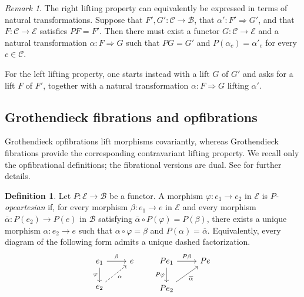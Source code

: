 \documentclass[12pt]{amsart}
\theoremstyle{definition}
\newtheorem{definition}[teo]{Definition}
\theoremstyle{remark}
\newtheorem{remark}{Remark}
\numberwithin{figure}{section}%
\newcommand{\Ba}{\mathcal{B}}
\newcommand{\bbar}{\overline}
\newcommand{\CC}{\mathcal{C}}
\newcommand{\E}{\mathcal{E}}
\begin{document}
\begin{remark}\label{Rem:Lift_Natural}
The right lifting property can equivalently be expressed in terms of
natural transformations. Suppose that
\(F',G'\colon\CC\to\Ba\), that
\(\alpha'\colon F'\Rightarrow G'\), and that
\(F\colon\CC\to\E\) satisfies \(PF=F'\). Then there must exist a functor
\(G\colon\CC\to\E\) and a natural transformation
\(\alpha\colon F\Rightarrow G\) such that
\(PG=G'\) and \(P(\alpha_c)=\alpha'_c\) for every \(c\in\CC\).

For the left lifting property, one starts instead with a lift \(G\) of
\(G'\) and asks for a lift \(F\) of \(F'\), together with a natural
transformation \(\alpha\colon F\Rightarrow G\) lifting \(\alpha'\).
\end{remark}

\subsection{Grothendieck fibrations and opfibrations}

Grothendieck opfibrations lift morphisms covariantly, whereas Grothendieck
fibrations provide the corresponding contravariant lifting property. We
recall only the opfibrational definitions; the fibrational versions are
dual. See
\cite{RosoliniGrothendieckFibrations,RiehlLoregianFibration,Varadarajan}
for further details.

\begin{definition}
Let \(P\colon\E\to\Ba\) be a functor. A morphism
\(\varphi\colon e_1\to e_2\) in \(\E\) is \emph{\(P\)-opcartesian} if,
for every morphism \(\beta\colon e_1\to e\) in \(\E\) and every morphism
\(\overline{\alpha}\colon P(e_2)\to P(e)\) in \(\Ba\) satisfying
\(\overline{\alpha}\circ P(\varphi)=P(\beta)\), there exists a unique
morphism \(\alpha\colon e_2\to e\) such that
\(\alpha\circ\varphi=\beta\) and
\(P(\alpha)=\overline{\alpha}\).
Equivalently, every diagram of the following form admits a unique dashed
factorization.
%
			\[\begin{tikzcd}
				e_1 \ar[d,"\varphi"']\arrow[r,"\beta"] &e \\
				e_2 \arrow[ur,dashrightarrow,"\alpha"']&  
			\end{tikzcd}
			\quad \quad
			\begin{tikzcd}
				Pe_1 \arrow[d,"P\varphi"'] \arrow[r,"P\beta"] &Pe \\
				Pe_2\arrow[ur,"{\bbar\alpha}"']& 
			\end{tikzcd}
			\]
			
\end{definition}
\end{document}
